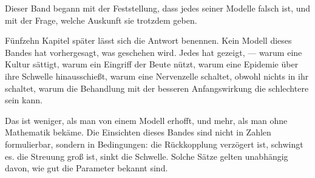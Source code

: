 \begin{merksatz}
\begin{center}
\begin{minipage}{0.9\textwidth}
Dieser Band begann mit der Feststellung, dass jedes seiner Modelle falsch ist, und mit der Frage, welche Auskunft sie trotzdem geben.

Fünfzehn Kapitel später lässt sich die Antwort benennen. Kein Modell dieses Bandes hat vorhergesagt, was geschehen wird. Jedes hat gezeigt,  --- warum eine Kultur sättigt, warum ein Eingriff der Beute nützt, warum eine Epidemie über ihre Schwelle hinausschießt, warum eine Nervenzelle schaltet, obwohl nichts in ihr schaltet, warum die Behandlung mit der besseren Anfangswirkung die schlechtere sein kann.

Das ist weniger, als man von einem Modell erhofft, und mehr, als man ohne Mathematik bekäme. Die Einsichten dieses Bandes sind nicht in Zahlen formulierbar, sondern in Bedingungen:  die Rückkopplung verzögert ist,  schwingt es.  die Streuung groß ist,  sinkt die Schwelle. Solche Sätze gelten unabhängig davon, wie gut die Parameter bekannt sind.
\end{minipage}
\end{center}

\begin{center}
\begin{minipage}{0.88\textwidth}
\end{minipage}
\end{center}
\end{merksatz}
